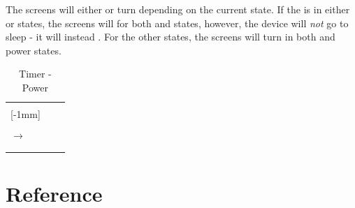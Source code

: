 The screens will either  or turn  depending on the current
state.  If the  is in either  or  states, the screens
will  for both  and  states, however, the device will
\textit{not} go to sleep - it will instead .  For the other 
states, the screens will turn  in both  and  power
states.

\begin{table}[H]
\begin{tabu}{ X[1,c,m] | X[1,c,m] | X[1,c,m] }
  \thrule
   &  &  \\ \mrule

  [-1mm]{}
    &   &  \\ 
  &     &  \\ \mrule

   $\rightarrow$  &   &  \\ \mrule
   &     &  \\

  \bhrule
\end{tabu}
\caption {Timer - Power}
\end{table}

\section{Reference}


